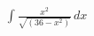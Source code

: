 \documentclass[preview]{standalone}
\begin{document}
\begin{align*}
\int \frac{x^2}{\sqrt{(36-x^2)}} \, dx
\end{align*}
\end{document}
